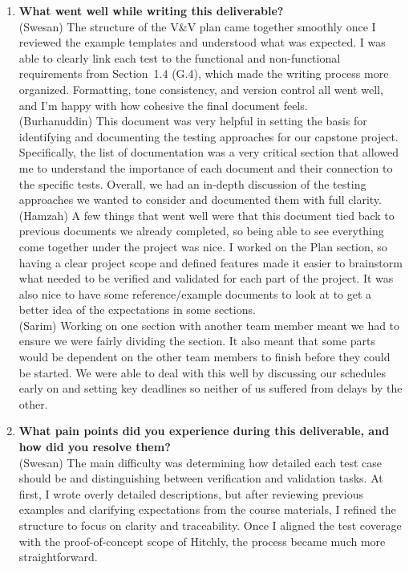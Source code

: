 \documentclass[12pt, titlepage]{article}
\begin{document}
\begin{enumerate}

\item \textbf{What went well while writing this deliverable?}\\
(Swesan) The structure of the V\&V plan came together smoothly once I reviewed the example templates and understood what was expected. I was able to clearly link each test to the functional and non-functional requirements from Section~1.4 (G.4), which made the writing process more organized. Formatting, tone consistency, and version control all went well, and I'm happy with how cohesive the final document feels.
\\
(Burhanuddin)
This document was very helpful in setting the basis for identifying and documenting the testing approaches for our capstone project. Specifically, the list of documentation was a very critical section that allowed me to understand the importance of each document and their connection to the specific tests. Overall, we had an in-depth discussion of the testing approaches we wanted to consider and documented them with full clarity.  
\\
(Hamzah)
A few things that went well were that this document tied back to previous documents we already completed, so being able to see everything come together under the project was nice. I worked on the Plan section, so having a clear project scope and defined features made it easier to brainstorm what needed to be verified and validated for each part of the project. It was also nice to have some reference/example documents to look at to get a better idea of the expectations in some sections.  
\\
(Sarim)
Working on one section with another team member meant we had to ensure we were fairly dividing the section. It also meant that some parts would be dependent on the other team members to finish before they could be started. We were able to deal with this well by discussing our schedules early on and setting key deadlines so neither of us suffered from delays by the other. 
\\
\item \textbf{What pain points did you experience during this deliverable, and how did you resolve them?}\\
(Swesan) The main difficulty was determining how detailed each test case should be and distinguishing between verification and validation tasks. At first, I wrote overly detailed descriptions, but after reviewing previous examples and clarifying expectations from the course materials, I refined the structure to focus on clarity and traceability. Once I aligned the test coverage with the proof-of-concept scope of Hitchly, the process became much more straightforward.

\end{enumerate}
\end{document}
